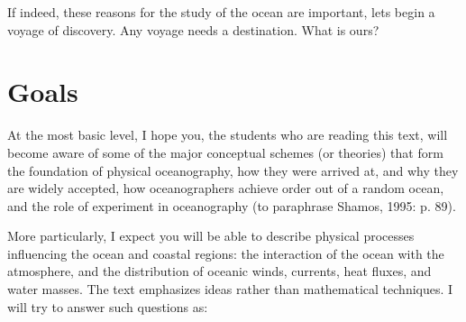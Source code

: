 If indeed, these reasons for the study of the ocean are important, lets
begin a voyage of discovery. Any voyage needs a destination. What is ours?

\section{Goals}
At the most basic level, I hope you, the students who are reading this text, will become aware of some of the major conceptual schemes (or theories) that form the foundation of physical oceanography, how they were arrived at, and why they are widely accepted, how oceanographers achieve order out of a random ocean, and the role of experiment in oceanography (to paraphrase Shamos, 1995: p. 89).

More particularly, I expect you will be able to describe physical processes influencing the ocean and coastal regions: the interaction of the ocean with the atmosphere, and the distribution of oceanic winds, currents, heat fluxes, and water masses. The text emphasizes ideas rather than mathematical techniques. I will try to answer such questions as:
